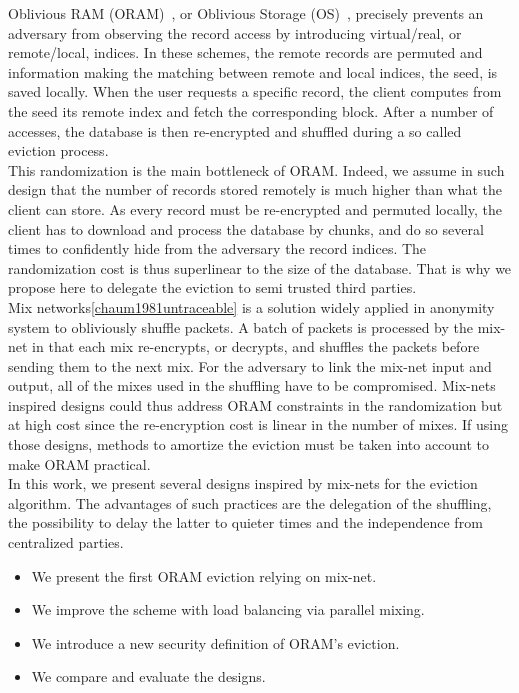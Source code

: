 \documentclass[USenglish,oneside,twocolumn]{article}
\begin{document}
Oblivious RAM (ORAM)~\cite{goldreich87}, or Oblivious Storage (OS)~\cite{boneh2011}, precisely prevents an adversary from observing the record access by introducing virtual/real, or remote/local, indices. In these schemes, the remote records are permuted and information making the matching between remote and local indices, the seed, is saved locally. When the user requests a specific record, the client computes from the seed its remote index and fetch the corresponding block. After a number of accesses, the database is then re-encrypted and shuffled during a so called eviction process.\\ 
This randomization is the main bottleneck of ORAM. Indeed, we assume in such design that the number of records stored remotely is much higher than what the client can store. As every record must be re-encrypted and permuted locally, the client has to download and process the database by chunks, and do so several times to confidently hide from the adversary the record indices. The randomization cost is thus superlinear to the size of the database. That is why we propose here to delegate the eviction to semi trusted third parties.\\
Mix networks\ref{chaum1981untraceable} is a solution widely applied in anonymity system to obliviously shuffle packets. A batch of packets is processed by the mix-net in that each mix re-encrypts, or decrypts, and shuffles the packets before sending them to the next mix. For the adversary to link the mix-net input and output, all of the mixes used in the shuffling have to be compromised.
Mix-nets inspired designs could thus address ORAM constraints in the randomization but at high cost since the re-encryption cost is linear in the number of mixes. If using those designs, methods to amortize the eviction must be taken into account to make ORAM practical.\\

In this work, we present several designs inspired by mix-nets for the eviction algorithm.
The advantages of such practices are the delegation of the shuffling, the possibility to delay the latter to quieter times and the independence from centralized parties.

\begin{itemize}
 \item We present the first ORAM eviction relying on mix-net.
 \item We improve the scheme with load balancing via parallel mixing.
 \item We introduce a new security definition of ORAM's eviction. %
 \item We compare and evaluate the designs.
\end{itemize}
\end{document}
